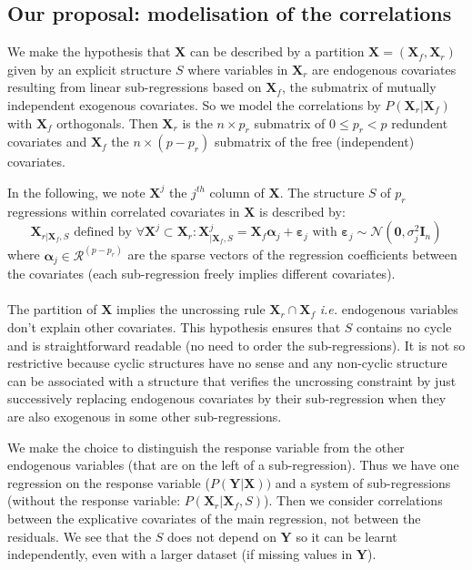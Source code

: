 \documentclass[11pt,a4paper]{article}
\begin{document}
	
\subsection{Our proposal: modelisation of the correlations}
We make the hypothesis that $\boldsymbol{X}$ can be described by a partition $\boldsymbol{X}=(\boldsymbol{X}_f,\boldsymbol{X}_r) $ given by an explicit structure $S$ where variables in $\boldsymbol{X}_r$ are endogenous covariates resulting from linear sub-regressions based on $\boldsymbol{X}_f$, the submatrix of mutually independent exogenous covariates.
So we model the correlations by $P(\boldsymbol{X}_r|\boldsymbol{X}_f) $ with $\boldsymbol{X}_f$ orthogonals.
 Then $\boldsymbol{X}_r$ is the $n\times p_r$ submatrix of $0\leq p_r <p$ redundent covariates and $\boldsymbol{X}_f$ the $n\times (p-p_r)$ submatrix of the free (independent) covariates.
 
 
 
In the following, we note $\boldsymbol{X}^j$ the $j^{th}$ column of $\boldsymbol{X}$.
The structure $S$ of $p_r$ regressions within correlated covariates in $\boldsymbol{X}$ is described by:
	\begin{equation}
		\boldsymbol{X}_{r|\boldsymbol{X}_f,S} \textrm{ defined by }\forall \boldsymbol{X}^j \subset \boldsymbol{X}_r: \boldsymbol{X}^j_{|\boldsymbol{X}_f,S}=\boldsymbol{X}_f\boldsymbol{\alpha}_j+\boldsymbol{\varepsilon}_j \textrm{ with } \boldsymbol{\varepsilon}_j \sim\mathcal{N}(\boldsymbol{0},\sigma^2_j\boldsymbol{I}_n) \label{SR}
	\end{equation}
		where $\boldsymbol{\alpha}_j \in \mathcal{R}^{(p-p_r)}$ are the sparse vectors of the regression coefficients between the covariates (each sub-regression freely implies different covariates). 
\\
\\


The partition of $\boldsymbol{X}$ implies the uncrossing rule  $\boldsymbol{X}_r \cap \boldsymbol{X}_f$ 
{\it i.e.} endogenous variables don't explain other covariates. This hypothesis ensures that $S$ contains no cycle and is straightforward readable (no need to order the sub-regressions). It is not so restrictive because cyclic structures have no sense and any non-cyclic structure can be associated with a structure that verifies the uncrossing constraint by just successively replacing endogenous covariates by their sub-regression when they are also exogenous in some other sub-regressions.

	
	  We make the choice to distinguish the response variable from the other endogenous variables (that are on the left of a sub-regression). Thus we have one regression on the response variable ($P(\boldsymbol{Y}|\boldsymbol{X}))$ and a system of sub-regressions (without the response variable: $P(\boldsymbol{X}_r|\boldsymbol{X}_f,S)$). Then we consider correlations between the explicative covariates of the main regression, not between the residuals. We see that the $S$ does not depend on $\boldsymbol{Y}$ so it can be learnt independently, even with a larger dataset (if missing values in $\boldsymbol{Y}$).
	 
\end{document}
